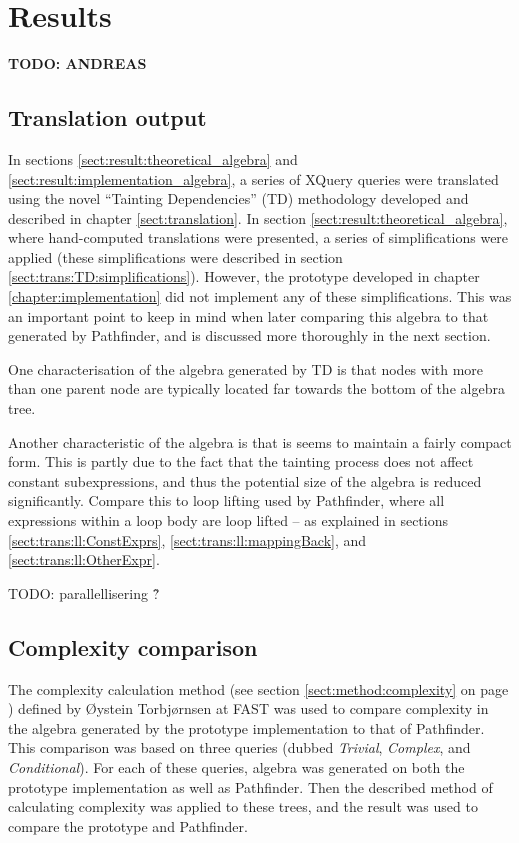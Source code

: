 \section{Results}
\label{sect:disc:res}
\textbf{\LARGE TODO: {{ANDREAS}}}

\subsection{Translation output}
\label{sect:disc:res:translation_output}
In sections \ref{sect:result:theoretical_algebra} and
\ref{sect:result:implementation_algebra}, a series of XQuery queries were
translated using the novel ``Tainting Dependencies'' (TD) methodology developed
and described in chapter \ref{sect:translation}. In section
\ref{sect:result:theoretical_algebra}, where hand-computed translations were
presented, a series of simplifications were applied (these simplifications were
described in section \ref{sect:trans:TD:simplifications}). However, the
prototype developed in chapter \ref{chapter:implementation} did not implement
any of these simplifications. This was an important point to keep in mind when
later comparing this algebra to that generated by Pathfinder, and is
discussed more thoroughly in the next section.

One characterisation of the algebra generated by TD is that nodes with more
than one parent node are typically located far towards the bottom of the algebra
tree. 

Another characteristic of the algebra is that is seems to maintain a fairly
compact form. This is partly due to the fact that the tainting process does not
affect constant subexpressions, and thus the potential size of the algebra is
reduced significantly. Compare this to loop lifting used by
Pathfinder, where all expressions within a loop body are loop lifted --
as explained in sections \ref{sect:trans:ll:ConstExprs},
\ref{sect:trans:ll:mappingBack}, and \ref{sect:trans:ll:OtherExpr}.

TODO: parallellisering \^ ?

\subsection{Complexity comparison}
\label{sect:disc:res:comparison}
The complexity calculation method (see section \ref{sect:method:complexity} on
page \pageref{sect:method:complexity}) defined by \O ystein Torbj\o rnsen at
FAST was used to compare complexity in the algebra generated by the prototype
implementation to that of Pathfinder. This comparison was
based on three queries (dubbed \emph{Trivial}, \emph{Complex}, and
\emph{Conditional}). For each of these queries, algebra was generated on both
the prototype implementation as well as Pathfinder. Then the described
method of calculating complexity was applied to these trees, and the result was
used to compare the prototype and Pathfinder.

